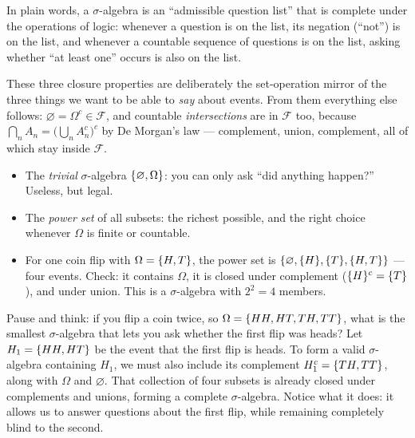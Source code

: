In plain words, a $\sigma$-algebra is an ``admissible question list'' that is
complete under the operations of logic: whenever a question is on the list, its
negation (``not'') is on the list, and whenever a countable sequence of
questions is on the list, asking whether ``at least one'' occurs is also on the
list.

These three closure properties are deliberately the set-operation mirror of the
three things we want to be able to \emph{say} about events. From them everything
else follows: $\varnothing = \Omega^c \in \mathcal{F}$, and countable
\emph{intersections} are in $\mathcal{F}$ too, because $\bigcap_n A_n =
\big(\bigcup_n A_n^c\big)^c$ by De Morgan's law --- complement, union,
complement, all of which stay inside $\mathcal{F}$.

\begin{example}
\label{ch03:ex-sigma}
\begin{itemize}
\item The \emph{trivial} $\sigma$-algebra $\{\varnothing, \Omega\}$: you can
only ask ``did anything happen?'' Useless, but legal.
\item The \emph{power set} of all subsets: the richest possible, and the right
choice whenever $\Omega$ is finite or countable.
\item For one coin flip with $\Omega = \{H,T\}$, the power set is
$\{\varnothing, \{H\}, \{T\}, \{H,T\}\}$ --- four events. Check: it
contains $\Omega$, it is closed under complement ($\{H\}^c = \{T\}$), and
under union. This is a $\sigma$-algebra with $2^2 = 4$ members.
\end{itemize}
\end{example}

Pause and think: if you flip a coin twice, so $\Omega = \{HH, HT, TH, TT\}$,
what is the smallest $\sigma$-algebra that lets you ask whether the first flip
was heads? Let $H_1 = \{HH, HT\}$ be the event that the first flip is heads.
To form a valid $\sigma$-algebra containing $H_1$, we must also include its
complement $H_1^c = \{TH, TT\}$, along with $\Omega$ and $\varnothing$. That
collection of four subsets is already closed under complements and unions,
forming a complete $\sigma$-algebra. Notice what it does: it allows us to answer
questions about the first flip, while remaining completely blind to the second.

